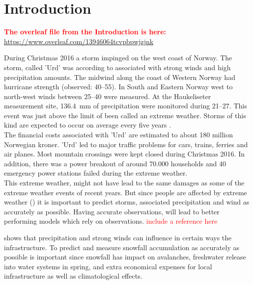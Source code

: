 \chapter{Introduction}
\label{ch:intro}
\textcolor{red}{\textbf{The overleaf file from the Introduction is here:} \\ \url{https://www.overleaf.com/13946064tcvpbpwjzjnk}}

During Christmas 2016 a storm impinged on the west coast of Norway. The storm, called 'Urd' was according to \cite{olsen_ekstremvaerrapport._2017} associated with strong winds and high precipitation amounts. The midwind along the coast of Western Norway had hurricane strength (observed: \SIrange{40}{55}{\mPs}). In South and Eastern Norway west to north-west winds between \SIrange{25}{40}{\mPs} were measured. At the Haukeliseter measurement site, \SI{136.4}{\milli\metre} of precipitation were monitored during \SIrange{21}{27}{\dec}.
This event was just above the limit of been called an extreme weather. Storms of this kind are expected to occur on average every five years \citep{olsen_ekstremvaerrapport._2017}. \\ 
The financial costs associated with 'Urd' are estimated to about 180 million Norwegian kroner.
'Urd' led to major traffic problems for cars, trains, ferries and air planes. Most mountain crossings were kept closed during Christmas 2016. 
In addition, there was a power breakout of around 70.000 households and 40 emergency power stations failed during the extreme weather. 
\\
This extreme weather, might not have lead to the same damages as some of the extreme weather events of recent years. But since people are affected by extreme weather () it is important to predict storms, associated precipitation and wind as accurately as possible. Having accurate observations, will lead to better performing models which rely on observations. \textcolor{red}{include a reference here}

\newline
\noindent
{} shows that precipitation and strong winds can influence in certain ways the infrastructure. To predict and measure snowfall accumulation as accurately as possible is important since snowfall has impact on avalanches, freshwater release into water systems in spring, and extra economical expenses for local infrastructure as well as climatological effects. \\
